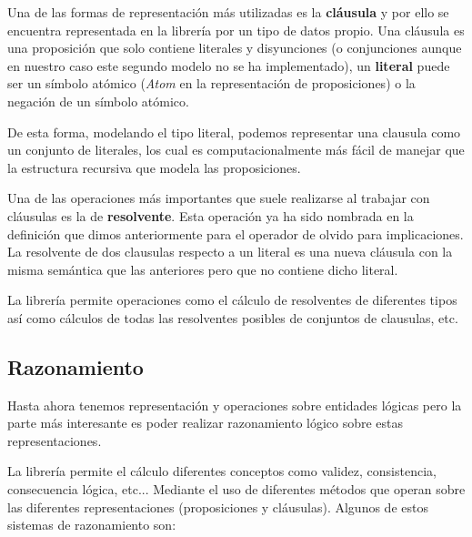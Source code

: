 	Una de las formas de representación más utilizadas es la \textbf{cláusula} y por ello se encuentra representada en la librería por un tipo de datos propio. Una cláusula es una proposición que solo contiene literales y disyunciones (o conjunciones aunque en nuestro caso este segundo modelo no se ha implementado), un \textbf{literal} puede ser un símbolo atómico (\textit{Atom} en la representación de proposiciones) o la negación de un símbolo atómico.
	
	De esta forma, modelando el tipo literal, podemos representar una clausula como un conjunto de literales, los cual es computacionalmente más fácil de manejar que la estructura recursiva que modela las proposiciones.
	
	Una de las operaciones más importantes que suele realizarse al trabajar con cláusulas es la de \textbf{resolvente}. Esta operación ya ha sido nombrada en la definición que dimos anteriormente para el operador de olvido para implicaciones. La resolvente de dos clausulas respecto a un literal es una nueva cláusula con la misma semántica que las anteriores pero que no contiene dicho literal. 
	
	La librería permite operaciones como el cálculo de resolventes de diferentes tipos así como cálculos de todas las resolventes posibles de conjuntos de clausulas, etc.
	

\subsection*{Razonamiento}

	Hasta ahora tenemos representación y operaciones sobre entidades lógicas pero la parte más interesante es poder realizar razonamiento lógico sobre estas representaciones.	
	
	La librería permite el cálculo diferentes conceptos como validez, consistencia, consecuencia lógica, etc... Mediante el uso de diferentes métodos que operan sobre las diferentes representaciones (proposiciones y cláusulas). Algunos de estos sistemas de razonamiento son:
	
